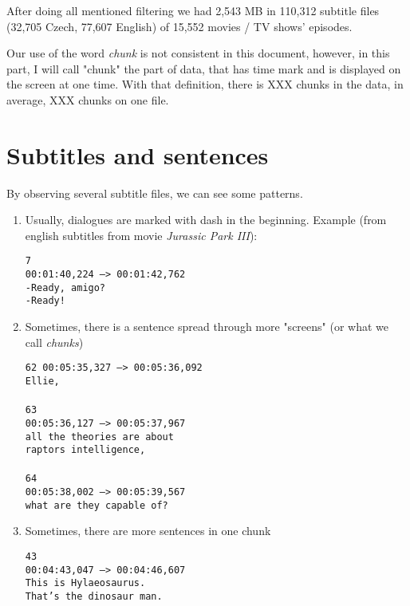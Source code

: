 After doing all mentioned filtering we had 2,543 MB in 110,312 subtitle files (32,705 Czech, 77,607 English) of 15,552 movies / TV shows' episodes.

Our use of the word \emph{chunk} is not consistent in this document, however, in this part, I will call "chunk" the part of data, that has time mark and is displayed on the screen at one time. With that definition, there is XXX chunks in the data, in average, XXX chunks on one file.

\section{Subtitles and sentences}

By observing several subtitle files, we can see some patterns. 

\begin{enumerate}
    \item Usually, dialogues are marked with dash in the beginning. Example (from english subtitles from movie \emph{Jurassic Park III}):
    
        \texttt{7 \\
        00:01:40,224 --> 00:01:42,762 \\
        -Ready, amigo? \\
        -Ready!}
        
    \item Sometimes, there is a sentence spread through more "screens" (or what we call \emph{chunks})
    
    \texttt{62
    00:05:35,327 --> 00:05:36,092\\
    Ellie,\\
\\
    63\\
    00:05:36,127 --> 00:05:37,967\\
    all the theories are about\\
    raptors intelligence,\\
\\
    64\\
    00:05:38,002 --> 00:05:39,567\\
    what are they capable of?}
    
    \item Sometimes, there are more sentences in one chunk
    
    \texttt{43\\
    00:04:43,047 --> 00:04:46,607\\
    This is Hylaeosaurus.\\
    That's the dinosaur man.}
    
\end{enumerate}

